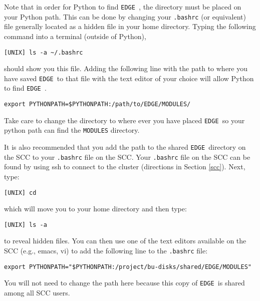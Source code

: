 \documentclass{article}
\newcommand{\edge}{\texttt{EDGE }}
\begin{document}
Note that in order for Python to find \edge, the directory must be placed on your Python path. This can be done by changing your \texttt{.bashrc} (or equivalent) file generally located as a hidden file in your home directory. Typing the following command into a terminal (outside of Python),

\vspace{2mm}
\texttt{[UNIX] ls -a \textasciitilde/.bashrc}
\vspace{2mm}

\noindent should show you this file. Adding the following line with the path to where you have saved \edge to that file with the text editor of your choice will allow Python to find \edge.

\vspace{2mm}
\texttt{export PYTHONPATH=\${PYTHONPATH}:/path/to/EDGE/MODULES/}
\vspace{2mm}

\noindent Take care to change the directory to where ever you have placed \edge so your python path can find the \texttt{MODULES} directory.

\vspace{2mm}

\noindent It is also recommended that you add the path to the shared \edge directory on the SCC to your \texttt{.bashrc} file on the SCC. Your \texttt{.bashrc} file on the SCC can be found by using ssh to connect to the cluster (directions in Section \ref{scc}). Next, type: 

\vspace{2mm}
\texttt{[UNIX] cd} 
\vspace{2mm}

\noindent which will move you to your home directory and then type:

\vspace{2mm}
\texttt{[UNIX] ls -a} 
\vspace{2mm}

\noindent to reveal hidden files. You can then use one of the text editors available on the SCC (e.g., emacs, vi) to add the following line to the \texttt{.bashrc} file:

\vspace{2mm}
\noindent \texttt{export PYTHONPATH="\${PYTHONPATH}:/project/bu-disks/shared/EDGE/MODULES"}
\vspace{2mm}

\noindent You will not need to change the path here because this copy of \edge is shared among all SCC users.
\end{document}
